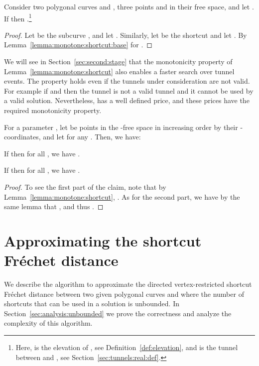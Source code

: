 \documentclass[12pt]{article}
\newcommand{\seclab}[1]{\label{sec:#1}}
\newcommand{\secref}[1]{Section~\ref{sec:#1}}
\newcommand{\lemlab}[1]{\label{lemma:#1}}
\newcommand{\lemref}[1]{Lemma~\ref{lemma:#1}}
\newcommand{\defref}[1]{Definition~\ref{def:#1}}
\newcommand{\Frechet}{Fr\'{e}c{h}e{}t\xspace}\providecommand{\Arr}{\mathop{\mathrm{\EuScript{A}}}}
\newcommand{\tunnel}{tunnel\xspace}
\numberwithin{figure}{section}
\numberwithin{equation}{section}
\newcommand{\vrestricted}{vertex-restricted}
\newcommand{\asymmetric}{directed}
\begin{document}
\begin{lemma}\lemlab{monotone:shortcut}Consider two polygonal curves  and , three points  and  in their free space, and let . If  then
    .\footnote{Here,  is the elevation of , see
       \defref{elevation}, and  is the tunnel
       between  and , see \secref{tunnels:real:def}.}
\end{lemma}

\begin{proof}
    Let  be the subcurve , and
    let .  Similarly, let
     be the shortcut  and
    let . By
    \lemref{monotone:shortcut:base}  for .
\end{proof}


We will see in \secref{second:stage} that the monotonicity property of
\lemref{monotone:shortcut} also enables a faster search over tunnel
events. The property holds even if the \tunnel{}s under consideration
are not valid. For example if  and 
then the tunnel  is not a valid tunnel and it
cannot be used by a valid solution. Nevertheless,
 has a well defined price, and these prices
have the required monotonicity property.


\begin{lemma}
    \lemlab{monotone:matrix}For a parameter , let  be
     points in the -free space in increasing order by their
    -coordinates, and let  for any .
    Then, we have:
    \begin{compactenum}[\qquad (A)]
        \item If  then for all , we have
        .
        
        \item If  then for all , we have
        .
    \end{compactenum}
\end{lemma}

\begin{proof}
    To see the first part of the claim, note that by
    \lemref{monotone:shortcut}, . As for the second
    part, we have by the same lemma that , and
    thus .
\end{proof}



\section{Approximating the shortcut \Frechet distance}\seclab{algo:unbounded:general}

We describe the algorithm to approximate the \asymmetric{} \vrestricted{}
shortcut \Frechet distance between two given polygonal curves  and 
where the number of shortcuts that can be used in a solution is unbounded.
In \secref{analysis:unbounded} we prove the correctness and analyze the
complexity of this algorithm.
\end{document}
